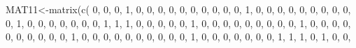 \documentclass[
  notitlepage,
  onecolumn,
  openany]{book}
\newenvironment{Shaded}{\begin{snugshade}}{\end{snugshade}}
\newcommand{\DecValTok}[1]{\textcolor[rgb]{0.00,0.00,0.81}{#1}}
\newcommand{\FunctionTok}[1]{\textcolor[rgb]{0.00,0.00,0.00}{#1}}
\newcommand{\NormalTok}[1]{#1}
\newcommand{\OtherTok}[1]{\textcolor[rgb]{0.56,0.35,0.01}{#1}}
\begin{document}
\begin{Shaded}
\begin{Highlighting}[]
\NormalTok{MAT11}\OtherTok{\textless{}{-}}\FunctionTok{matrix}\NormalTok{(}\FunctionTok{c}\NormalTok{(}
        \DecValTok{0}\NormalTok{, }\DecValTok{0}\NormalTok{, }\DecValTok{0}\NormalTok{, }\DecValTok{1}\NormalTok{, }\DecValTok{0}\NormalTok{, }\DecValTok{0}\NormalTok{, }\DecValTok{0}\NormalTok{, }\DecValTok{0}\NormalTok{, }\DecValTok{0}\NormalTok{, }\DecValTok{0}\NormalTok{, }\DecValTok{0}\NormalTok{,}
        \DecValTok{0}\NormalTok{, }\DecValTok{0}\NormalTok{, }\DecValTok{0}\NormalTok{, }\DecValTok{1}\NormalTok{, }\DecValTok{0}\NormalTok{, }\DecValTok{0}\NormalTok{, }\DecValTok{0}\NormalTok{, }\DecValTok{0}\NormalTok{, }\DecValTok{0}\NormalTok{, }\DecValTok{0}\NormalTok{, }\DecValTok{0}\NormalTok{,}
        \DecValTok{0}\NormalTok{, }\DecValTok{0}\NormalTok{, }\DecValTok{0}\NormalTok{, }\DecValTok{1}\NormalTok{, }\DecValTok{0}\NormalTok{, }\DecValTok{0}\NormalTok{, }\DecValTok{0}\NormalTok{, }\DecValTok{0}\NormalTok{, }\DecValTok{0}\NormalTok{, }\DecValTok{0}\NormalTok{, }\DecValTok{0}\NormalTok{,}
        \DecValTok{1}\NormalTok{, }\DecValTok{1}\NormalTok{, }\DecValTok{1}\NormalTok{, }\DecValTok{0}\NormalTok{, }\DecValTok{0}\NormalTok{, }\DecValTok{0}\NormalTok{, }\DecValTok{0}\NormalTok{, }\DecValTok{0}\NormalTok{, }\DecValTok{1}\NormalTok{, }\DecValTok{0}\NormalTok{, }\DecValTok{0}\NormalTok{,}
        \DecValTok{0}\NormalTok{, }\DecValTok{0}\NormalTok{, }\DecValTok{0}\NormalTok{, }\DecValTok{0}\NormalTok{, }\DecValTok{0}\NormalTok{, }\DecValTok{0}\NormalTok{, }\DecValTok{0}\NormalTok{, }\DecValTok{1}\NormalTok{, }\DecValTok{0}\NormalTok{, }\DecValTok{0}\NormalTok{, }\DecValTok{0}\NormalTok{,}
        \DecValTok{0}\NormalTok{, }\DecValTok{0}\NormalTok{, }\DecValTok{0}\NormalTok{, }\DecValTok{0}\NormalTok{, }\DecValTok{0}\NormalTok{, }\DecValTok{0}\NormalTok{, }\DecValTok{0}\NormalTok{, }\DecValTok{1}\NormalTok{, }\DecValTok{0}\NormalTok{, }\DecValTok{0}\NormalTok{, }\DecValTok{0}\NormalTok{,}
        \DecValTok{0}\NormalTok{, }\DecValTok{0}\NormalTok{, }\DecValTok{0}\NormalTok{, }\DecValTok{0}\NormalTok{, }\DecValTok{0}\NormalTok{, }\DecValTok{0}\NormalTok{, }\DecValTok{0}\NormalTok{, }\DecValTok{1}\NormalTok{, }\DecValTok{0}\NormalTok{, }\DecValTok{0}\NormalTok{, }\DecValTok{0}\NormalTok{,}
        \DecValTok{0}\NormalTok{, }\DecValTok{0}\NormalTok{, }\DecValTok{0}\NormalTok{, }\DecValTok{0}\NormalTok{, }\DecValTok{1}\NormalTok{, }\DecValTok{1}\NormalTok{, }\DecValTok{1}\NormalTok{, }\DecValTok{0}\NormalTok{, }\DecValTok{1}\NormalTok{, }\DecValTok{0}\NormalTok{, }\DecValTok{0}\NormalTok{,}

\end{Highlighting}
\end{Shaded}
\end{document}
